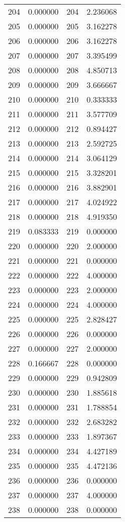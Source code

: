 \documentclass[12pt]{article}
\begin{document}
\begin{longtable}{@{}cccc@{}}
204 & 0.000000 & 204 & 2.236068 \\
205 & 0.000000 & 205 & 3.162278 \\
206 & 0.000000 & 206 & 3.162278 \\
207 & 0.000000 & 207 & 3.395499 \\
208 & 0.000000 & 208 & 4.850713 \\
209 & 0.000000 & 209 & 3.666667 \\
210 & 0.000000 & 210 & 0.333333 \\
211 & 0.000000 & 211 & 3.577709 \\
212 & 0.000000 & 212 & 0.894427 \\
213 & 0.000000 & 213 & 2.592725 \\
214 & 0.000000 & 214 & 3.064129 \\
215 & 0.000000 & 215 & 3.328201 \\
216 & 0.000000 & 216 & 3.882901 \\
217 & 0.000000 & 217 & 4.024922 \\
218 & 0.000000 & 218 & 4.919350 \\
219 & 0.083333 & 219 & 0.000000 \\
220 & 0.000000 & 220 & 2.000000 \\
221 & 0.000000 & 221 & 0.000000 \\
222 & 0.000000 & 222 & 4.000000 \\
223 & 0.000000 & 223 & 2.000000 \\
224 & 0.000000 & 224 & 4.000000 \\
225 & 0.000000 & 225 & 2.828427 \\
226 & 0.000000 & 226 & 0.000000 \\
227 & 0.000000 & 227 & 2.000000 \\
228 & 0.166667 & 228 & 0.000000 \\
229 & 0.000000 & 229 & 0.942809 \\
230 & 0.000000 & 230 & 1.885618 \\
231 & 0.000000 & 231 & 1.788854 \\
232 & 0.000000 & 232 & 2.683282 \\
233 & 0.000000 & 233 & 1.897367 \\
234 & 0.000000 & 234 & 4.427189 \\
235 & 0.000000 & 235 & 4.472136 \\
236 & 0.000000 & 236 & 0.000000 \\
237 & 0.000000 & 237 & 4.000000 \\
238 & 0.000000 & 238 & 0.000000 \\

\end{longtable}
\end{document}
